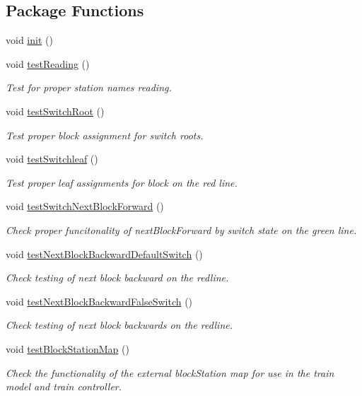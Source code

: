 \subsection*{Package Functions}
\begin{DoxyCompactItemize}
\item 
void \hyperlink{classTrackModelTest_1_1GreenlineTest_a3c1cb1eeb41248285ee3e24d71de725c}{init} ()
\item 
void \hyperlink{classTrackModelTest_1_1GreenlineTest_a2f4824d6b276c671fd1204b6a3050931}{test\+Reading} ()
\begin{DoxyCompactList}\small\item\em Test for proper station names reading. \end{DoxyCompactList}\item 
void \hyperlink{classTrackModelTest_1_1GreenlineTest_adbaf11be550589c327cfd7463c1566b2}{test\+Switch\+Root} ()
\begin{DoxyCompactList}\small\item\em Test proper block assignment for switch roots. \end{DoxyCompactList}\item 
void \hyperlink{classTrackModelTest_1_1GreenlineTest_a30c32f186283625347dfd35d4b946f64}{test\+Switchleaf} ()
\begin{DoxyCompactList}\small\item\em Test proper leaf assignments for block on the red line. \end{DoxyCompactList}\item 
void \hyperlink{classTrackModelTest_1_1GreenlineTest_a28f8d0536ddf0225f15cc2e5761bddbd}{test\+Switch\+Next\+Block\+Forward} ()
\begin{DoxyCompactList}\small\item\em Check proper funcitonality of next\+Block\+Forward by switch state on the green line. \end{DoxyCompactList}\item 
void \hyperlink{classTrackModelTest_1_1GreenlineTest_a6d7f0f79f5afa3a6ba6200a41aae0553}{test\+Next\+Block\+Backward\+Default\+Switch} ()
\begin{DoxyCompactList}\small\item\em Check testing of next block backward on the redline. \end{DoxyCompactList}\item 
void \hyperlink{classTrackModelTest_1_1GreenlineTest_abd1ef62857c0df3d5df25ac390edce4b}{test\+Next\+Block\+Backward\+False\+Switch} ()
\begin{DoxyCompactList}\small\item\em Check testing of next block backwards on the redline. \end{DoxyCompactList}\item 
void \hyperlink{classTrackModelTest_1_1GreenlineTest_ad29a8522be040d3f6af724992e63d58d}{test\+Block\+Station\+Map} ()
\begin{DoxyCompactList}\small\item\em Check the functionality of the external block\+Station map for use in the train model and train controller. \end{DoxyCompactList}\end{DoxyCompactItemize}
